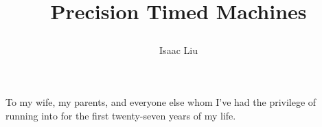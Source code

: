 \documentclass[11pt]{ucthesis}
\begin{document}
\title{Precision Timed Machines
\iffalse
From Ptides to PtidyOS, Designing Distributed Real-Time Embedded Systems
  \titlenote{This work was supported in part by the Center for Hybrid and Embedded Software Systems (CHESS) at UC Berkeley, which receives support from the National Science Foundation (NSF awards \#0720882 (CSR-EHS: PRET), \#0931843 (ActionWebs), and \#1035672 (CSR-)CPS Ptides)), the U. S. Army Research Office (ARO \#W911NF-07-2-0019), the U. S. Air Force Office of Scientific Research (MURI \#FA9550-06-0312), the Air Force Research Lab (AFRL), the Multiscale Systems Center (MuSyC), one of six research centers funded under the Focus Center Research Program, a Semiconductor Research Corporation program, and the following companies: Bosch, National Instruments, Thales, and Toyota.}
\fi
}
\author{Isaac Liu} 

\maketitle
\approvalpage
\copyrightpage

% 

\begin{frontmatter}

\begin{dedication}
\null\vfil
{\large
\begin{center}
To my wife, my parents, and everyone else whom I've had the privilege of running into for the first twenty-seven years of my life.
\end{center}}
\vfil\null
\end{dedication}


% 
% 
% 
% 
% 
% 
% 
% 
% 
% 
% 
% 
% 

\tableofcontents
\listoffigures
\listoftables

\end{frontmatter}
\end{document}
